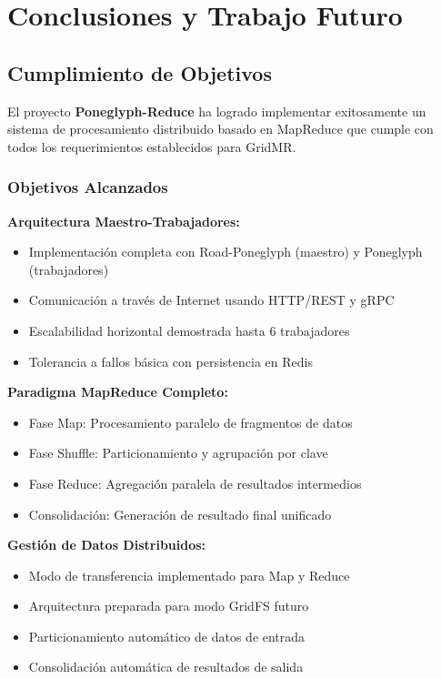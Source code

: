 \section{Conclusiones y Trabajo Futuro}

\subsection{Cumplimiento de Objetivos}

El proyecto \textbf{Poneglyph-Reduce} ha logrado implementar exitosamente un sistema de procesamiento distribuido basado en MapReduce que cumple con todos los requerimientos establecidos para GridMR.

\subsubsection{Objetivos Alcanzados}

\textbf{Arquitectura Maestro-Trabajadores:}
\begin{itemize}
    \item Implementación completa con Road-Poneglyph (maestro) y Poneglyph (trabajadores)
    \item Comunicación a través de Internet usando HTTP/REST y gRPC
    \item Escalabilidad horizontal demostrada hasta 6 trabajadores
    \item Tolerancia a fallos básica con persistencia en Redis
\end{itemize}

\textbf{Paradigma MapReduce Completo:}
\begin{itemize}
    \item Fase Map: Procesamiento paralelo de fragmentos de datos
    \item Fase Shuffle: Particionamiento y agrupación por clave
    \item Fase Reduce: Agregación paralela de resultados intermedios
    \item Consolidación: Generación de resultado final unificado
\end{itemize}

\textbf{Gestión de Datos Distribuidos:}
\begin{itemize}
    \item Modo de transferencia implementado para Map y Reduce
    \item Arquitectura preparada para modo GridFS futuro
    \item Particionamiento automático de datos de entrada
    \item Consolidación automática de resultados de salida
\end{itemize}

